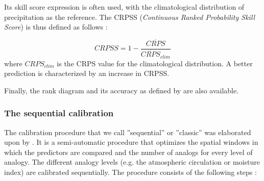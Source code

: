 \documentclass[gmd]{copernicus}
\begin{document}
Its skill score expression is often used, with the climatological distribution of precipitation as the reference. The CRPSS (\textit{Continuous Ranked Probability Skill Score}) is thus defined as follows \citep{Bradley2011}:

\begin{equation}
\label{eq:CRPSS}
CRPSS = 1-\frac{\overline{CRPS}}{\overline{CRPS}_{clim}}
\end{equation}
where $CRPS_{clim}$ is the CRPS value for the climatological distribution. A better prediction is characterized by an increase in CRPSS.

Finally, the rank diagram \citep{Talagrand1997} and its accuracy as defined by \citet{Candille2005} are also available.


\subsubsection{The sequential calibration}
\label{sec:sequential}

The calibration procedure that we call ''sequential'' or ''classic'' was elaborated upon by \citet{Bontron2004} \cite[see also][]{Radanovics2013, BenDaoud2016}. It is a semi-automatic procedure that optimizes the spatial windows in which the predictors are compared and the number of analogs for every level of analogy. The different analogy levels (e.g. the atmospheric circulation or moisture index) are calibrated sequentially. The procedure consists of the following steps \citep{Bontron2004}:
\end{document}
